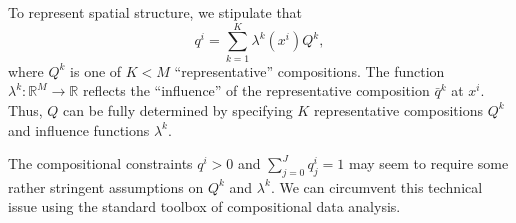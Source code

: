 \documentclass[english]{scrartcl}
\newcommand\R[0]{\mathbb{R}}
\begin{document}
	To represent spatial structure, we stipulate that 
	\begin{equation}
		q^i = \sum_{k = 1}^K \lambda^k(x^i) Q^k, \label{spatial_structure}
	\end{equation}
	where $Q^k$ is one of $K < M$ ``representative'' compositions. The function $\lambda^k:\R^M\rightarrow \R$ reflects the ``influence'' of the representative composition $\bar{q}^k$ at $x^i$. Thus, $Q$ can be fully determined by specifying $K$ representative compositions $Q^k$ and influence functions $\lambda^k$. 

	The compositional constraints $q^i > 0$ and $\sum_{j = 0}^J q^i_j = 1$ may seem to require some rather stringent assumptions on $Q^k$ and $\lambda^k$. We can circumvent this technical issue using the standard toolbox of compositional data analysis. 
\end{document}
